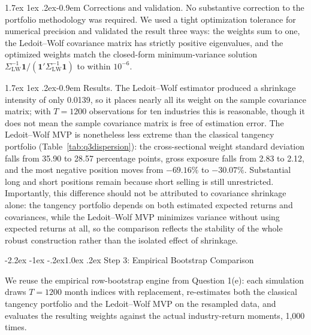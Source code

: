 \documentclass[11pt]{article}
\makeatletter
\renewcommand\subsection{\@startsection{subsection}{2}{0pt}%
  {-2.2ex \@plus -1ex \@minus -.2ex}{1.0ex \@plus .2ex}%
  {\normalfont\bfseries\normalsize\color{psink}}}
\renewcommand\paragraph{\@startsection{paragraph}{4}{0pt}%
  {1.7ex \@plus 1ex \@minus .2ex}{-0.9em}%
  {\normalfont\bfseries\normalsize\color{psink}}}
\makeatother
\begin{document}
\paragraph{Corrections and validation.} No substantive correction to the
portfolio methodology was required. We used a tight optimization tolerance
for numerical precision and validated the result three ways: the weights sum
to one, the Ledoit--Wolf covariance matrix has strictly positive eigenvalues,
and the optimized weights match the closed-form minimum-variance solution
$\Sigma_{\text{LW}}^{-1}\mathbf{1}/(\mathbf{1}'\Sigma_{\text{LW}}^{-1}\mathbf{1})$
to within $10^{-6}$.

\paragraph{Results.} The Ledoit--Wolf estimator produced a shrinkage
intensity of only 0.0139, so it places nearly all its weight on the sample
covariance matrix; with $T=1200$ observations for ten industries this is
reasonable, though it does not mean the sample covariance matrix is free of
estimation error. The Ledoit--Wolf MVP is nonetheless less extreme than the
classical tangency portfolio (Table~\ref{tab:q3dispersion}): the
cross-sectional weight standard deviation falls from 35.90 to 28.57
percentage points, gross exposure falls from 2.83 to 2.12, and the most
negative position moves from $-69.16\%$ to $-30.07\%$. Substantial long and
short positions remain because short selling is still unrestricted.
Importantly, this difference should not be attributed to covariance
shrinkage alone: the tangency portfolio depends on both estimated expected
returns and covariances, while the Ledoit--Wolf MVP minimizes variance
without using expected returns at all, so the comparison reflects the
stability of the whole robust construction rather than the isolated effect of
shrinkage.

\subsection{Step 3: Empirical Bootstrap Comparison}

We reuse the empirical row-bootstrap engine from Question 1(e): each
simulation draws $T=1200$ month indices with replacement, re-estimates both
the classical tangency portfolio and the Ledoit--Wolf MVP on the resampled
data, and evaluates the resulting weights against the actual industry-return
moments, 1{,}000 times.
\end{document}

